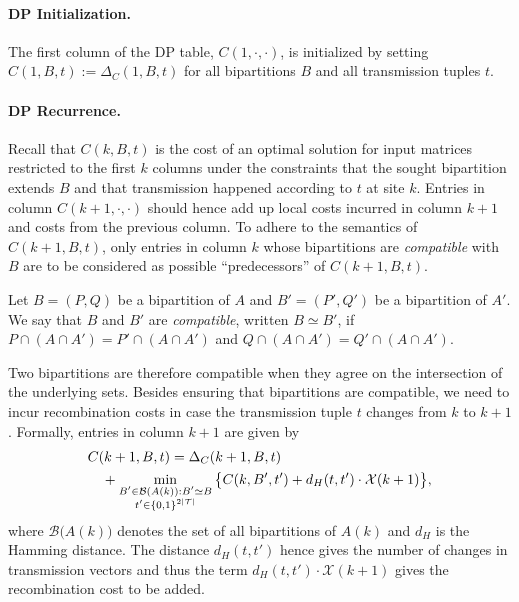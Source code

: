 \paragraph{DP Initialization.}
The first column of the DP table, $C(1,\cdot,\cdot)$, is initialized by setting $C(1,B,t):=\Delta_C(1,B,t)$ for all bipartitions $B$ and all transmission tuples $t$.

\paragraph{DP Recurrence.}
Recall that $C(k,B,t)$ is the cost of an optimal solution for input matrices restricted to the first $k$ columns under the constraints that the sought bipartition extends $B$ and that transmission happened according to $t$ at site $k$.
Entries in column $C(k+1,\cdot,\cdot)$ should hence add up local costs incurred in column $k+1$ and costs from the previous column. 
To adhere to the semantics of $C(k+1,B,t)$, only entries in column $k$ whose bipartitions are \emph{compatible} with $B$ are to be considered as possible ``predecessors'' of $C(k+1,B,t)$.
\begin{definition}
Let $B=(P,Q)$ be a bipartition of $A$ and $B'=(P',Q')$ be a bipartition of $A'$.
We say that $B$ and $B'$ are \emph{compatible}, written $B\simeq B'$, if
$P\cap(A\cap A') = P'\cap(A\cap A')$
and
$Q\cap(A\cap A') = Q'\cap(A\cap A')$.
\end{definition}
Two bipartitions are therefore compatible when they agree on the intersection of the underlying sets.
Besides ensuring that bipartitions are compatible, we need to incur recombination costs in case the transmission tuple $t$ changes from $k$ to $k+1$.
Formally, entries in column $k+1$ are given by
\begin{align}\label{eqn:recurrence}
& C(k+1,B,t)= \Delta_C(k+1,B,t)\\
& \quad + \min_{\substack{B'\in\mathcal{B}(A(k)):B'\simeq B\\t'\in\{0,1\}^{2{\left\lvert \mathcal{T} \right\rvert}}}}\big\{C(k,B',t')+d_H(t,t')\cdot\mathcal{X}(k+1)\big\}, \nonumber
\end{align}
where $\mathcal{B}\big(A(k)\big)$ denotes the set of all bipartitions of $A(k)$ and $d_H$ is the Hamming distance.
The distance $d_H(t,t')$ hence gives the number of changes in transmission vectors and thus the term $d_H(t,t')\cdot\mathcal{X}(k+1)$ gives the recombination cost to be added.

